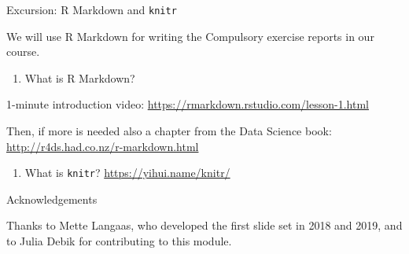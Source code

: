 \documentclass[ignorenonframetext,]{beamer}
\providecommand{\tightlist}{%
  \setlength{\itemsep}{0pt}\setlength{\parskip}{0pt}}
\begin{document}
\begin{frame}[fragile]{Excursion: R Markdown and \texttt{knitr}}

We will use R Markdown for writing the Compulsory exercise reports in
our course.

\begin{enumerate}
\def\labelenumi{\arabic{enumi})}
\tightlist
\item
  What is R Markdown?
\end{enumerate}

1-minute introduction video:
\url{https://rmarkdown.rstudio.com/lesson-1.html}

Then, if more is needed also a chapter from the Data Science book:
\url{http://r4ds.had.co.nz/r-markdown.html}

\begin{enumerate}
\def\labelenumi{\arabic{enumi})}
\setcounter{enumi}{1}
\tightlist
\item
  What is \texttt{knitr}? \url{https://yihui.name/knitr/}
\end{enumerate}

\end{frame}

\begin{frame}{Acknowledgements}

Thanks to Mette Langaas, who developed the first slide set in 2018 and
2019, and to Julia Debik for contributing to this module.

\end{frame}
\end{document}
